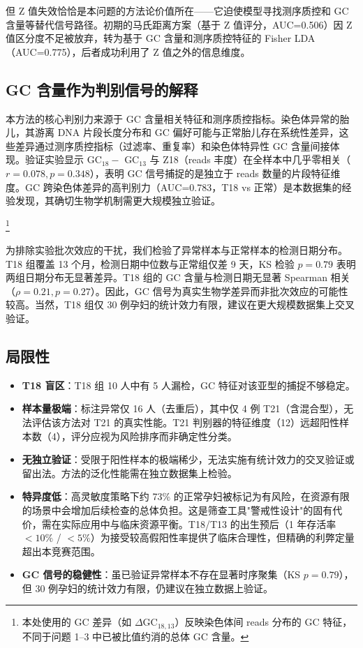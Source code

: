 \documentclass{internal-report}
\begin{document}
但 Z 值失效恰恰是本问题的方法论价值所在——它迫使模型寻找测序质控和 GC 含量等替代信号路径。初期的马氏距离方案（基于 Z 值评分，AUC=0.506）因 Z 值区分度不足被放弃，转为基于 GC 含量和测序质控特征的 Fisher LDA（AUC=0.775），后者成功利用了 Z 值之外的信息维度。

\subsection{GC 含量作为判别信号的解释}

本方法的核心判别力来源于 GC 含量相关特征和测序质控指标。染色体异常的胎儿，其游离 DNA 片段长度分布和 GC 偏好可能与正常胎儿存在系统性差异，这些差异通过测序质控指标（过滤率、重复率）和染色体特异性 GC 含量间接体现。验证实验显示 GC$_{18} -$ GC$_{13}$ 与 Z18（reads 丰度）在全样本中几乎零相关（$r=0.078, p=0.348$），表明 GC 信号捕捉的是独立于 reads 数量的片段特征维度。GC 跨染色体差异的高判别力（AUC=0.783，T18 vs 正常）是本数据集的经验发现，其确切生物学机制需更大规模独立验证。

\footnote{本处使用的 GC 差异（如 $\Delta$GC$_{18,13}$）反映染色体间 reads 分布的 GC 特征，不同于问题 1--3 中已被比值约消的总体 GC 含量。}

为排除实验批次效应的干扰，我们检验了异常样本与正常样本的检测日期分布。T18 组覆盖 13 个月，检测日期中位数与正常组仅差 9 天，KS 检验 $p=0.79$ 表明两组日期分布无显著差异。T18 组的 GC 含量与检测日期无显著 Spearman 相关（$\rho=0.21, p=0.27$）。因此，GC 信号为真实生物学差异而非批次效应的可能性较高。当然，T18 组仅 30 例孕妇的统计效力有限，建议在更大规模数据集上交叉验证。

\subsection{局限性}

\begin{itemize}
    \item \textbf{T18 盲区}：T18 组 10 人中有 5 人漏检，GC 特征对该亚型的捕捉不够稳定。
    \item \textbf{样本量极端}：标注异常仅 16 人（去重后），其中仅 4 例 T21（含混合型），无法评估该方法对 T21 的真实性能。T21 判别器的特征维度（12）远超阳性样本数（4），评分应视为风险排序而非确定性分类。
    \item \textbf{无独立验证}：受限于阳性样本的极端稀少，无法实施有统计效力的交叉验证或留出法。方法的泛化性能需在独立数据集上检验。
    \item \textbf{特异度低}：高灵敏度策略下约 73\% 的正常孕妇被标记为有风险，在资源有限的场景中会增加后续检查的总体负担。这是筛查工具"警戒性设计"的固有代价，需在实际应用中与临床资源平衡。T18/T13 的出生预后（1 年存活率 $<10\%$ / $<5\%$）为接受较高假阳性率提供了临床合理性，但精确的利弊定量超出本竞赛范围。
    \item \textbf{GC 信号的稳健性}：虽已验证异常样本不存在显著时序聚集（KS $p=0.79$），但 30 例孕妇的统计效力有限，仍建议在独立数据上验证。
\end{itemize}
\end{document}

